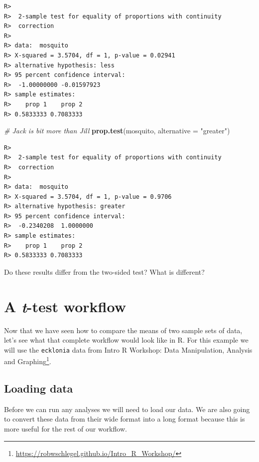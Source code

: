 \documentclass[english,10pt,a4paper,oneside]{book}
\renewcommand{\href}[2]{#2\footnote{\url{#1}}}
\let\rmarkdownfootnote\footnote%
\def\footnote{\protect\rmarkdownfootnote}
\newenvironment{Shaded}{\begin{snugshade}}{\end{snugshade}}
\newcommand{\CommentTok}[1]{\textcolor[rgb]{0.56,0.35,0.01}{\textit{#1}}}
\newcommand{\DataTypeTok}[1]{\textcolor[rgb]{0.13,0.29,0.53}{#1}}
\newcommand{\KeywordTok}[1]{\textcolor[rgb]{0.13,0.29,0.53}{\textbf{#1}}}
\newcommand{\NormalTok}[1]{#1}
\newcommand{\StringTok}[1]{\textcolor[rgb]{0.31,0.60,0.02}{#1}}
\theoremstyle{definition}
\theoremstyle{definition}
\theoremstyle{definition}
\theoremstyle{remark}
\begin{document}
\begin{verbatim}
R> 
R>  2-sample test for equality of proportions with continuity
R>  correction
R> 
R> data:  mosquito
R> X-squared = 3.5704, df = 1, p-value = 0.02941
R> alternative hypothesis: less
R> 95 percent confidence interval:
R>  -1.00000000 -0.01597923
R> sample estimates:
R>    prop 1    prop 2 
R> 0.5833333 0.7083333
\end{verbatim}

\begin{Shaded}
\begin{Highlighting}[]
\CommentTok{# Jack is bit more than Jill}
\KeywordTok{prop.test}\NormalTok{(mosquito, }\DataTypeTok{alternative =} \StringTok{"greater"}\NormalTok{)}
\end{Highlighting}
\end{Shaded}

\begin{verbatim}
R> 
R>  2-sample test for equality of proportions with continuity
R>  correction
R> 
R> data:  mosquito
R> X-squared = 3.5704, df = 1, p-value = 0.9706
R> alternative hypothesis: greater
R> 95 percent confidence interval:
R>  -0.2340208  1.0000000
R> sample estimates:
R>    prop 1    prop 2 
R> 0.5833333 0.7083333
\end{verbatim}

Do these results differ from the two-sided test? What is different?

\hypertarget{a-t-test-workflow}{%
\section{\texorpdfstring{A \emph{t}-test
workflow}{A t-test workflow}}\label{a-t-test-workflow}}

Now that we have seen how to compare the means of two sample sets of
data, let's see what that complete workflow would look like in R. For
this example we will use the \texttt{ecklonia} data from
\href{https://robwschlegel.github.io/Intro_R_Workshop/}{Intro R
Workshop: Data Manipulation, Analysis and Graphing}.

\hypertarget{loading-data}{%
\subsection{Loading data}\label{loading-data}}

Before we can run any analyses we will need to load our data. We are
also going to convert these data from their wide format into a long
format because this is more useful for the rest of our workflow.
\end{document}

